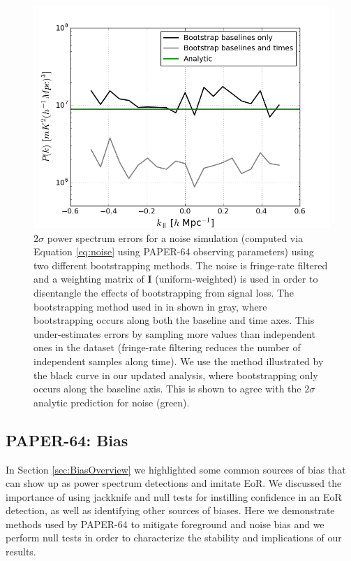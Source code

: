 \documentclass[preprint2,numberedappendix,tighten]{aastex6}  %
\begin{document}
\begin{figure}
	\centering
	\includegraphics[trim={0.3cm 0cm 0.3cm 0.3cm},width=\columnwidth]{plots/noise_errors.png}
	\caption{$2\sigma$ power spectrum errors for a noise simulation (computed via Equation \eqref{eq:noise} using PAPER-64 observing parameters) using two different bootstrapping 
methods. The noise is fringe-rate filtered and a weighting matrix of $\textbf{I}$ (uniform-weighted) is used in order to disentangle the 
effects of bootstrapping from signal loss. The bootstrapping method used in  in shown in gray, where bootstrapping occurs along both the baseline and time axes. This under-estimates errors by sampling more values than independent ones in the dataset (fringe-rate filtering reduces the number of independent samples along time). We use the method illustrated by the black curve in our updated analysis, where bootstrapping only occurs along the baseline axis. This is shown to agree with the $2\sigma$ analytic prediction for noise (green).}
	\label{fig:data_errors}
\end{figure}


\subsection{PAPER-64: Bias}
\label{sec:Bias}

In Section \ref{sec:BiasOverview} we highlighted some common sources of bias that can show up as power spectrum 
detections and imitate EoR. We discussed the importance of using jackknife and null tests for instilling confidence in an EoR 
detection, as well as identifying other sources of biases. Here we demonstrate methods used by PAPER-64 to mitigate 
foreground and noise bias and we perform null tests in order to characterize the stability and implications of our results.
\end{document}
